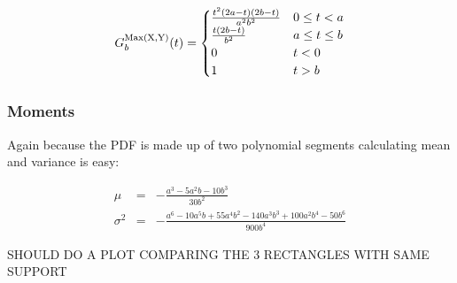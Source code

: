 \begin{equation}
 G^{\rm Max( X, Y)}_b(t) =
 \begin{cases}
 \frac{t^2 (2 a-t) (2 b-t)}{a^2 b^2} & 0 \le t < a \\ 
 \frac{t (2 b-t)}{b^2} & a \le t  \le b \\ 
 0 & t < 0\\
 1 & t > b
 \end{cases}
\end{equation}




\subsubsection{Moments}

Again because the PDF is made up of two polynomial segments calculating mean and variance is easy:

\begin{eqnarray}
 \mu &= &-\frac{a^3-5 a^2 b-10 b^3}{30 b^2}\\
 \sigma^{2} & = & -\frac{a^6-10 a^5 b+55 a^4 b^2-140 a^3 b^3+100 a^2 b^4-50 b^6}{900 b^4}
\end{eqnarray}








SHOULD DO A PLOT COMPARING THE 3 RECTANGLES WITH SAME SUPPORT





